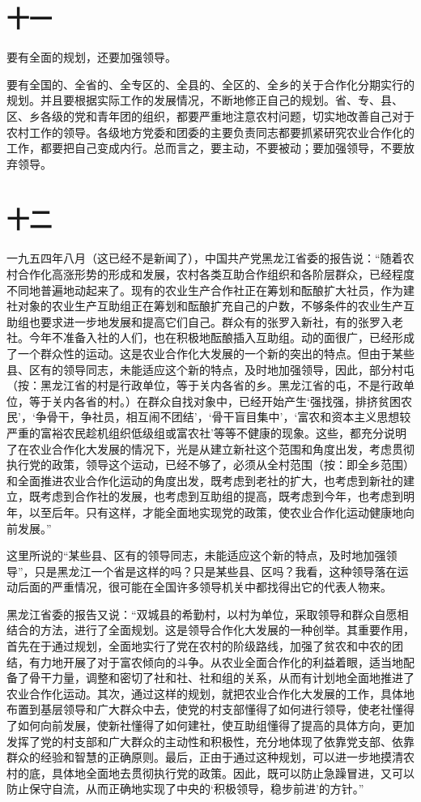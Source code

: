 \section*{十一}

要有全面的规划，还要加强领导。

要有全国的、全省的、全专区的、全县的、全区的、全乡的关于合作化分期实行的规划。并且要根据实际工作的发展情况，不断地修正自己的规划。省、专、县、区、乡各级的党和青年团的组织，都要严重地注意农村问题，切实地改善自己对于农村工作的领导。各级地方党委和团委的主要负责同志都要抓紧研究农业合作化的工作，都要把自己变成内行。总而言之，要主动，不要被动；要加强领导，不要放弃领导。

\section*{十二}

一九五四年八月（这已经不是新闻了），中国共产党黑龙江省委的报告说：“随着农村合作化高涨形势的形成和发展，农村各类互助合作组织和各阶层群众，已经程度不同地普遍地动起来了。现有的农业生产合作社正在筹划和酝酿扩大社员，作为建社对象的农业生产互助组正在筹划和酝酿扩充自己的户数，不够条件的农业生产互助组也要求进一步地发展和提高它们自己。群众有的张罗入新社，有的张罗入老社。今年不准备入社的人们，也在积极地酝酿插入互助组。动的面很广，已经形成了一个群众性的运动。这是农业合作化大发展的一个新的突出的特点。但由于某些县、区有的领导同志，未能适应这个新的特点，及时地加强领导，因此，部分村屯（按：黑龙江省的村是行政单位，等于关内各省的乡。黑龙江省的屯，不是行政单位，等于关内各省的村。）在群众自找对象中，已经开始产生‘强找强，排挤贫困农民’，‘争骨干，争社员，相互闹不团结’，‘骨干盲目集中’，‘富农和资本主义思想较严重的富裕农民趁机组织低级组或富农社’等等不健康的现象。这些，都充分说明了在农业合作化大发展的情况下，光是从建立新社这个范围和角度出发，考虑贯彻执行党的政策，领导这个运动，已经不够了，必须从全村范围（按：即全乡范围）和全面推进农业合作化运动的角度出发，既考虑到老社的扩大，也考虑到新社的建立，既考虑到合作社的发展，也考虑到互助组的提高，既考虑到今年，也考虑到明年，以至后年。只有这样，才能全面地实现党的政策，使农业合作化运动健康地向前发展。”

这里所说的“某些县、区有的领导同志，未能适应这个新的特点，及时地加强领导”，只是黑龙江一个省是这样的吗？只是某些县、区吗？我看，这种领导落在运动后面的严重情况，很可能在全国许多领导机关中都找得出它的代表人物来。

黑龙江省委的报告又说：“双城县的希勤村，以村为单位，采取领导和群众自愿相结合的方法，进行了全面规划。这是领导合作化大发展的一种创举。其重要作用，首先在于通过规划，全面地实行了党在农村的阶级路线，加强了贫农和中农的团结，有力地开展了对于富农倾向的斗争。从农业全面合作化的利益着眼，适当地配备了骨干力量，调整和密切了社和社、社和组的关系，从而有计划地全面地推进了农业合作化运动。其次，通过这样的规划，就把农业合作化大发展的工作，具体地布置到基层领导和广大群众中去，使党的村支部懂得了如何进行领导，使老社懂得了如何向前发展，使新社懂得了如何建社，使互助组懂得了提高的具体方向，更加发挥了党的村支部和广大群众的主动性和积极性，充分地体现了依靠党支部、依靠群众的经验和智慧的正确原则。最后，正由于通过这种规划，可以进一步地摸清农村的底，具体地全面地去贯彻执行党的政策。因此，既可以防止急躁冒进，又可以防止保守自流，从而正确地实现了中央的‘积极领导，稳步前进’的方针。”


